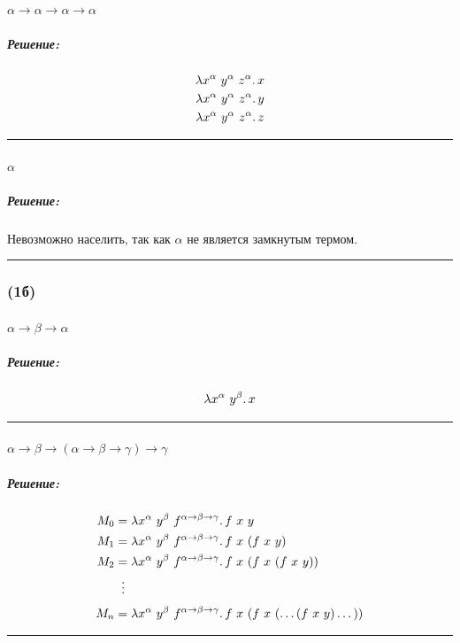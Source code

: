 \documentclass{article}
\newenvironment{proof}{\subparagraph{\hspace{-1em}Решение:\newline}}{\par\noindent\rule{\textwidth}{0.4pt}}
\begin{document}
    \paragraph{} $\alpha \to \alpha \to \alpha \to \alpha$

    \begin{proof}
        \begin{gather*}
            \lambda x^\alpha~y^\alpha~z^\alpha\ldotp x\\
            \lambda x^\alpha~y^\alpha~z^\alpha\ldotp y\\
            \lambda x^\alpha~y^\alpha~z^\alpha\ldotp z
        \end{gather*}
    \end{proof}

    \paragraph{} $\alpha$

    \begin{proof}
        Невозможно населить, так как $\alpha$ не является замкнутым термом.
    \end{proof}

    \subsubsection{(1б)}

    \paragraph{} $\alpha \to \beta \to \alpha$

    \begin{proof}
        \[
            \lambda x^\alpha~y^\beta\ldotp x
        \]
    \end{proof}

    \paragraph{} $\alpha \to \beta \to (\alpha \to \beta \to \gamma) \to \gamma$

    \begin{proof}
        \[
            \begin{aligned}
                M_0 &= \lambda x^\alpha~y^\beta~f^{\alpha \to \beta \to \gamma} \ldotp f~x~y \\
                M_1 &= \lambda x^\alpha~y^\beta~f^{\alpha \to \beta \to \gamma} \ldotp f~x~(f~x~y) \\
                M_2 &= \lambda x^\alpha~y^\beta~f^{\alpha \to \beta \to \gamma} \ldotp f~x~(f~x~(f~x~y)) \\
                &\;\;\vdots \\[1mm]
                M_n &= \lambda x^\alpha~y^\beta~f^{\alpha \to \beta \to \gamma} \ldotp f~x~(f~x~(\dots(f~x~y)\dots))
            \end{aligned}
        \]
    \end{proof}
\end{document}
